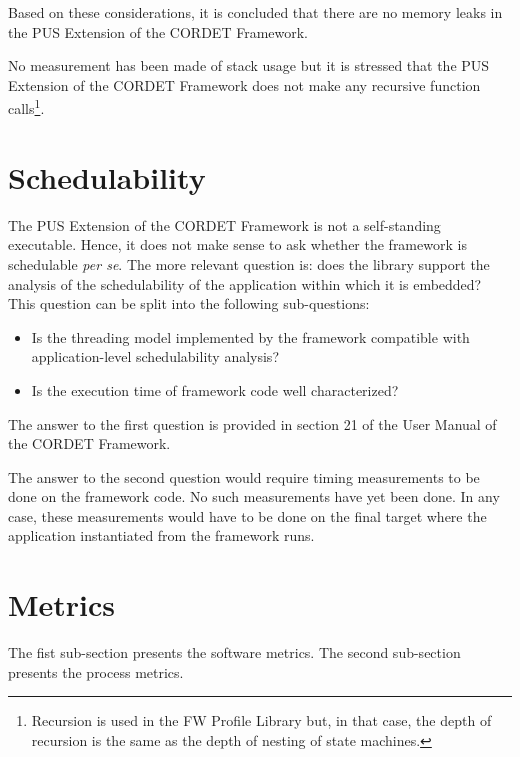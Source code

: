 \documentclass{pnp_article}
\begin{document}
Based on these considerations, it is concluded that there are no memory leaks in the PUS Extension of the CORDET Framework.

No measurement has been made of stack usage but it is stressed that the PUS Extension of the CORDET Framework does not make any recursive function calls\footnote{Recursion is used in the FW Profile Library but, in that case, the depth of recursion is the same as the depth of nesting of state machines.}.



\section{Schedulability}\label{sec:svrSched}
The PUS Extension of the CORDET Framework is not a self-standing executable. Hence, it does not make sense to ask whether the framework is schedulable \textit{per se}. The more relevant question is: does the library support the analysis of the schedulability of the application within which it is embedded? This question can be split into the following sub-questions:

\begin{itemize}
\item Is the threading model implemented by the framework compatible with application-level schedulability analysis?
\item Is the execution time of framework code well characterized?
\end{itemize}

The answer to the first question is provided in section 21 of the User Manual of the CORDET Framework.

The answer to the second question would require timing measurements to be done on the framework code. No such measurements have yet been done. In any case, these measurements would have to be done on the final target where the application instantiated from the framework runs. 



\section{Metrics}\label{sec:svrMetrics}
The fist sub-section presents the software metrics. The second sub-section presents the process metrics.
\end{document}
